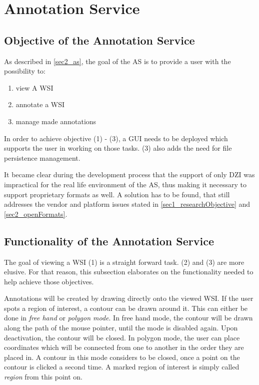 \chapter{Annotation Service}

\section{Objective of the Annotation Service}
\label{sec4_objective}
As described in \ref{sec2_as}, the goal of the AS is to provide a user with the possibility to:
\begin{enumerate}[(1)]
	\item view A WSI
	\item annotate a WSI
	\item manage made annotations
\end{enumerate}

In order to achieve objective (1) - (3), a GUI needs to be deployed which supports the user in working on those tasks. (3) also adds the need for file persistence management.

It became clear during the development process that the support of only DZI was impractical for the real life environment of the AS, thus making it necessary to support proprietary formats as well. A solution has to be found, that still addresses the vendor and platform issues stated in \ref{sec1_researchObjective} and \ref{sec2_openFormats}.


\section{Functionality of the Annotation Service}
\label{sec4_functions}
The goal of viewing a WSI (1) is a straight forward task. (2) and (3) are more elusive. For that reason, this subsection elaborates on the functionality needed to help achieve those objectives.

Annotations will be created by drawing directly onto the viewed WSI. If the user spots a region of interest, a contour can be drawn around it. This can  either be done in \emph{free hand} or \emph{polygon mode}. In free hand mode, the contour will be drawn along the path of the mouse pointer, until the mode is disabled again. Upon deactivation, the contour will be closed. In polygon mode, the user can place coordinates which will be connected from one to another in the order they are placed in. A contour in this mode considers to be closed, once a point on the contour is clicked a second time. A marked region of interest is simply called \emph{region} from this point on.

